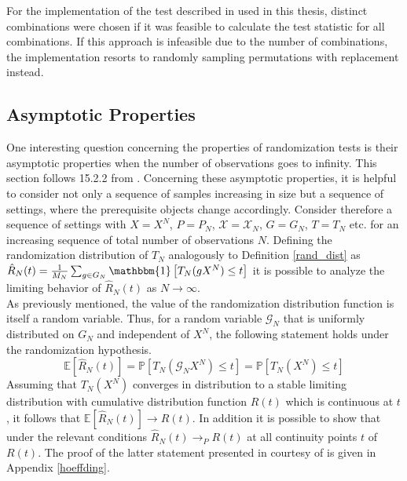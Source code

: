 \documentclass[12pt, a4paper]{article}
\theoremstyle{MAstyle} \newtheorem{assumption}{Assumption}[section]
\theoremstyle{MAstyle} \newtheorem{definition}{Definition}[section]
\theoremstyle{MAstyle} \newtheorem{theorem}{Theorem}[section]
\begin{document}
			For the implementation of the test described in \cite{bugni_permutation_2021} used in this thesis, distinct combinations were chosen if it was feasible to calculate the test statistic for all combinations. If this approach is infeasible due to the number of combinations, the implementation resorts to randomly sampling permutations with replacement instead.
		
		\subsection{Asymptotic Properties}\label{perm_asymp}
			One interesting question concerning the properties of randomization tests is their asymptotic properties when the number of observations goes to infinity. This section follows 15.2.2 from \cite{lehmann_testing_2005}. Concerning these asymptotic properties, it is helpful to consider not only a sequence of samples increasing in size but a sequence of settings, where the prerequisite objects change accordingly. Consider therefore a sequence of settings with $X = X^N$, $P = P_N$, $\mathcal{X} = \mathcal{X}_N$, $G = G_N$, $T = T_N$ etc. for an increasing sequence of total number of observations $N$.
			Defining the randomization distribution of $T_N$ analogously to Definition \ref{rand_dist} as $\hat{R}_N(t) = \frac{1}{M_N} \sum_{g \in G_N} \mathbbm{1} \left[T_N(gX^N) \leq t\right]$ it is possible to analyze the limiting behavior of $\hat{R}_N(t)$ as $N \rightarrow \infty$.\\
			As previously mentioned, the value of the randomization distribution function is itself a random variable. Thus, for a random variable $\mathcal{G}_N$ that is uniformly distributed on $G_N$ and independent of $X^N$, the following statement holds under the randomization hypothesis.
			\begin{equation}
				\mathbb{E}[\hat{R}_N(t)] = \mathbb{P}\left[T_N(\mathcal{G}_NX^N) \leq t\right] = \mathbb{P}\left[T_N(X^N) \leq t\right]
			\end{equation}
			Assuming that $T_N(X^N)$ converges in distribution to a stable limiting distribution with cumulative distribution function $R(t)$ which is continuous at $t$, it follows that $\mathbb{E}[\hat{R}_N(t)] \rightarrow R(t)$. In addition it is possible to show that under the relevant conditions $\hat{R}_N(t) \rightarrow_P R(t)$ at all continuity points $t$ of $R(t)$. The proof of the latter statement presented in \cite{lehmann_testing_2005} courtesy of \cite{hoeffding_large-sample_1952} is given in Appendix \ref{hoeffding}.\\
			
\end{document}
